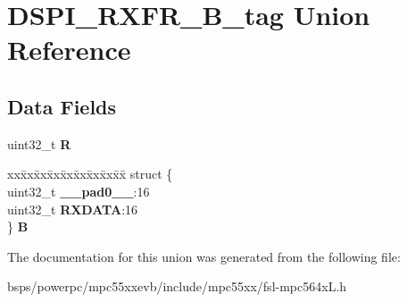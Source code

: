 \hypertarget{unionDSPI__RXFR__32B__tag}{}\section{D\+S\+P\+I\+\_\+\+R\+X\+F\+R\+\_\+B\+\_\+tag Union Reference}
\label{unionDSPI__RXFR__32B__tag}
\subsection*{Data Fields}
\begin{DoxyCompactItemize}
\item 
\mbox{\label{unionDSPI__RXFR__32B__tag_ac687df2daafb41df8ebf83913b7af1f0}} 
uint32\+\_\+t {\bfseries R}
\item 
\mbox{\label{unionDSPI__RXFR__32B__tag_abbee72f3c008b7796769b414ec344500}} 
\begin{tabbing}
xx\=xx\=xx\=xx\=xx\=xx\=xx\=xx\=xx\=\kill
struct \{\\
\>uint32\_t {\bfseries \_\_pad0\_\_}:16\\
\>uint32\_t {\bfseries RXDATA}:16\\
\} {\bfseries B}\\

\end{tabbing}\end{DoxyCompactItemize}


The documentation for this union was generated from the following file\+:\begin{DoxyCompactItemize}
\item 
bsps/powerpc/mpc55xxevb/include/mpc55xx/fsl-\/mpc564x\+L.\+h\end{DoxyCompactItemize}
